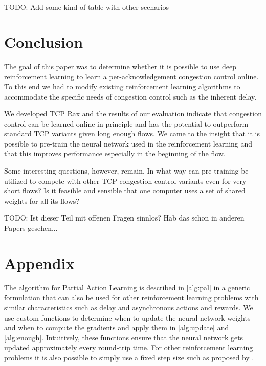 \documentclass[sigconf]{acmart}
\newcommand\note[2]{{\color{#1}#2}}
\newcommand\todo[1]{{\note{red}{TODO: #1}}}
\begin{document}
\todo{Add some kind of table with other scenarios}

\section{Conclusion}

The goal of this paper was to determine whether it is possible to use deep reinforcement learning to learn a per-acknowledgement congestion control online. To this end we had to modify existing reinforcement learning algorithms to accommodate the specific needs of congestion control such as the inherent delay. 

We developed TCP Rax and the results of our evaluation indicate that congestion control can be learned online in principle and has the potential to outperform standard TCP variants given long enough flows. We came to the insight that it is possible to pre-train the neural network used in the reinforcement learning and that this improves performance especially in the beginning of the flow. 

Some interesting questions, however, remain. In what way can pre-training be utilized to compete with other TCP congestion control variants even for very short flows? Is it feasible and sensible that one computer uses a set of shared weights for all its flows?

\todo{Ist dieser Teil mit offenen Fragen sinnlos? Hab das schon in anderen Papers gesehen...}

\section*{Appendix}	

The algorithm for Partial Action Learning is described in \autoref{alg:pal} in a generic formulation that can also be used for other reinforcement learning problems with similar characteristics such as delay and asynchronous actions and rewards. We use custom functions to determine when to update the neural network weights and when to compute the gradients and apply them in \autoref{alg:update} and \autoref{alg:enough}. Intuitively, these functions ensure that the neural network gets updated approximately every round-trip time. For other reinforcement learning problems it is also possible to simply use a fixed step size such as proposed by \cite{mnih_asynchronous_2016}.
\end{document}
